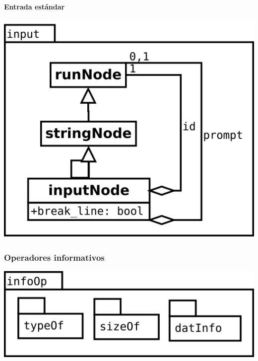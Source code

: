 \paragraph {Entrada estándar} 
\begin{center}
\includegraphics[scale=0.4]{input.png} \\
\end{center}
\pagebreak
\subsubsection {Operadores informativos} 
\begin{center}
\includegraphics[scale=0.4]{infoOp-package.png} \\
\end{center}

